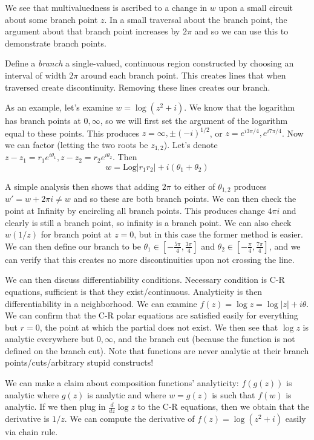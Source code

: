 \documentclass[10pt]{report}
\newcommand{\rd}[2]{\frac{d#1}{d#2}}
\newcommand{\abs}[1]{\left|#1\right|}
\newcommand{\Log}[0]{\mathrm{Log} }
\begin{document}
We see that multivaluedness is ascribed to a change in $w$ upon a small circuit about some branch point $z$. In a small traversal about the branch point, the argument about that branch point increases by $2\pi$ and so we can use this to demonstrate branch points.

Define a \emph{branch} a single-valued, continuous region constructed by choosing an interval of width $2\pi$ around each branch point. This creates lines that when traversed create discontinuity. Removing these lines creates our branch. 

As an example, let's examine $w=\log(z^2 + i)$. We know that the logarithm has branch points at $0,\infty$, so we will first set the argument of the logarithm equal to these points. This produces $z = \infty, \pm (-i)^{1/2}$, or $z=e^{i3\pi/4}, e^{i7\pi/4}$. Now we can factor (letting the two roots be $z_{1,2}$). Let's denote $z-z_1 = r_1e^{i\theta_1}, z-z_2 = r_2e^{i\theta_2}$. Then
$$w = \Log\abs{r_1 r_2} + i\left( \theta_1 + \theta_2 \right)$$

A simple analysis then shows that adding $2\pi$ to either of $\theta_{1,2}$ produces $w' = w+2\pi i \neq w$ and so these are both branch points. We can then check the point at Infinity by encircling all branch points. This produces change $4\pi i$ and clearly is still a branch point, so infinity is a branch point. We can also check $w(1/z)$ for branch point at $z=0$, but in this case the former method is easier. We can then define our branch to be $\theta_1 \in \left[ -\frac{5\pi}{4},\frac{3\pi}{4} \right]$ and $\theta_2 \in \left[ -\frac{\pi}{4},\frac{7\pi}{4} \right]$, and we can verify that this creates no more discontinuities upon not crossing the line. 

We can then discuss differentiability conditions. Necessary condition is C-R equations, sufficient is that they exist/continuous. Analyticity is then differentiability in a neighborhood. We can examine $f(z) = \log z = \log |z| + i\theta$. We can confirm that the C-R polar equations are satisfied easily for everything but $r=0$, the point at which the partial does not exist. We then see that $\log z$ is analytic everywhere but $0,\infty$, and the branch cut (because the function is not defined on the branch cut). Note that functions are never analytic at their branch points/cuts/arbitrary stupid constructs! 

We can make a claim about composition functions' analyticity: $f(g(z))$ is analytic where $g(z)$ is analytic and where $w = g(z)$ is such that $f(w)$ is analytic. If we then plug in $\rd{}{z} \log z$ to the C-R equations, then we obtain that the derivative is $1/z$. We can compute the derivative of $f(z) = \log (z^2 + i)$ easily via chain rule.
\end{document}
